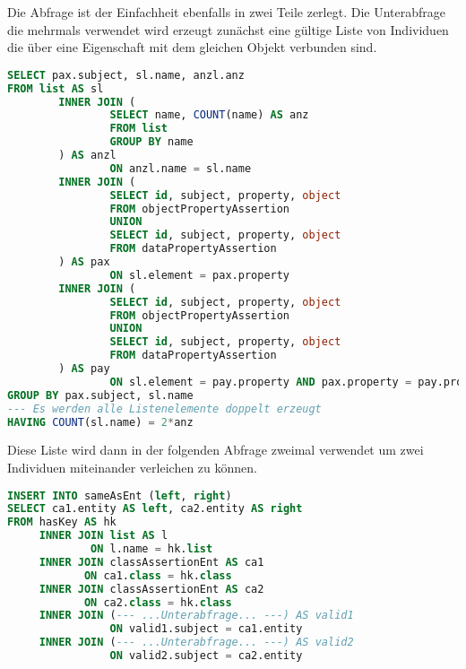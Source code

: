 Die Abfrage ist der Einfachheit ebenfalls in zwei Teile zerlegt. Die Unterabfrage die mehrmals verwendet wird erzeugt zunächst eine gültige Liste von Individuen die über eine Eigenschaft mit dem gleichen Objekt verbunden sind.
\begin{lstlisting}[language=SQL]
SELECT pax.subject, sl.name, anzl.anz
FROM list AS sl
        INNER JOIN (
                SELECT name, COUNT(name) AS anz
                FROM list
                GROUP BY name
        ) AS anzl
                ON anzl.name = sl.name
        INNER JOIN (
                SELECT id, subject, property, object
                FROM objectPropertyAssertion
                UNION
                SELECT id, subject, property, object
                FROM dataPropertyAssertion
        ) AS pax
                ON sl.element = pax.property
        INNER JOIN (
                SELECT id, subject, property, object
                FROM objectPropertyAssertion
                UNION
                SELECT id, subject, property, object
                FROM dataPropertyAssertion
        ) AS pay
                ON sl.element = pay.property AND pax.property = pay.property AND pax.object = pay.object
GROUP BY pax.subject, sl.name
--- Es werden alle Listenelemente doppelt erzeugt
HAVING COUNT(sl.name) = 2*anz
\end{lstlisting}

Diese Liste wird dann in der folgenden Abfrage zweimal verwendet um zwei Individuen miteinander verleichen zu können.
\begin{lstlisting}[language=SQL]
INSERT INTO sameAsEnt (left, right)
SELECT ca1.entity AS left, ca2.entity AS right
FROM hasKey AS hk
     INNER JOIN list AS l
             ON l.name = hk.list
     INNER JOIN classAssertionEnt AS ca1
            ON ca1.class = hk.class
     INNER JOIN classAssertionEnt AS ca2
            ON ca2.class = hk.class
     INNER JOIN (--- ...Unterabfrage... ---) AS valid1
                ON valid1.subject = ca1.entity
     INNER JOIN (--- ...Unterabfrage... ---) AS valid2
                ON valid2.subject = ca2.entity
\end{lstlisting}